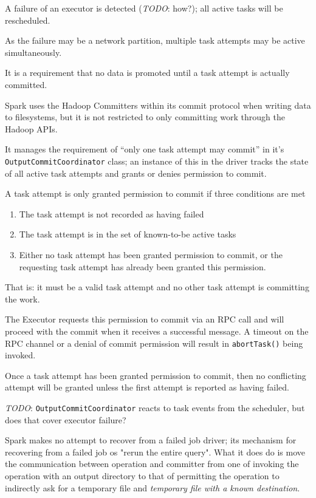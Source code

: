 \documentclass[conference]{IEEEtran}
\newcommand{\TODO}{\emph{TODO}}
\begin{document}
A failure of an executor is detected (\TODO: how?);
all active tasks will be rescheduled.

As the failure may be a network partition, multiple task attempts may be active
simultaneously.

It is a requirement that no data is promoted until a task attempt is actually
committed.


Spark uses the Hadoop Committers within its commit protocol when
writing data to filesystems, but it is not restricted to only committing work
through the Hadoop APIs.

It manages the requirement of ``only one task attempt may commit'' in it's
\texttt{OutputCommitCoordinator} class;
an instance of this in the driver tracks the state of all active task attempts
and grants or denies permission to commit.

A task attempt is only granted permission to commit if three conditions
are met
\begin{enumerate}
  \item The task attempt is not recorded as having failed
  \item The task attempt is in the set of known-to-be active tasks
  \item Either no task attempt has been granted permission to commit, or
  the requesting task attempt has already been granted this permission.
\end{enumerate}

That is: it must be a valid task attempt and no other task attempt is
committing the work.

The Executor requests this permission to commit via an RPC call and will
proceed with the commit when it receives a successful message.
A timeout on the RPC channel or a denial of commit permission will result
in \texttt{abortTask()} being invoked.

Once a task attempt has been granted permission to commit, then no conflicting
attempt will be granted unless the first attempt is reported as having failed.

\TODO: \texttt{OutputCommitCoordinator} reacts to task events from the scheduler, but
does that cover executor failure?

Spark makes no attempt to recover from a failed job driver;
its mechanism for recovering from a failed job os "rerun the entire query".
What it does do is move the communication between operation and committer
from one of invoking the operation with an output directory to
that of permitting the operation to indirectly ask for a temporary file
and \emph{temporary file with a known destination}.
\end{document}
